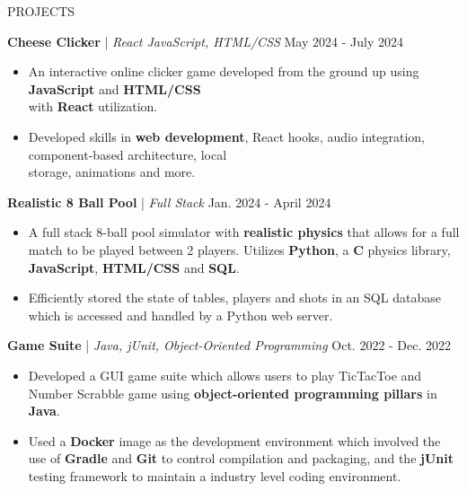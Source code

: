\begin{rSection}{PROJECTS}

\quad\textbf{Cheese Clicker} | \textit{React JavaScript, HTML/CSS } \hfill May 2024 - July 2024\\
\renewcommand\labelitemi{$\vcenter{\hbox{\tiny$\bullet$}}$}
\begin{itemize}
    \itemsep -4pt {} \vspace{-1.5em}
        \item An interactive online clicker game developed from the ground up using \textbf{JavaScript} and \textbf{HTML/CSS} \\ with \textbf{React} utilization.
        \item Developed skills in \textbf{web development}, React hooks, audio integration, component-based architecture, local \\ storage, animations and more.
\end{itemize}

\quad\textbf{Realistic 8 Ball Pool} | \textit{Full Stack} \hfill Jan. 2024 - April 2024\\
\renewcommand\labelitemi{$\vcenter{\hbox{\tiny$\bullet$}}$}
\begin{itemize}
    \itemsep -4pt {} \vspace{-1.5em} 
        \item A full stack 8-ball pool simulator with \textbf{realistic physics} that allows for a full match to be played between 2 players. Utilizes \textbf{Python}, a \textbf{C} physics library, \textbf{JavaScript}, \textbf{HTML/CSS} and \textbf{SQL}.
        \item Efficiently stored the state of tables, players and shots in an SQL database which is accessed and handled by a Python web server.
\end{itemize}

\quad\textbf{Game Suite} | \textit{Java, jUnit, Object-Oriented Programming } \hfill Oct. 2022 - Dec. 2022\\
\renewcommand\labelitemi{$\vcenter{\hbox{\tiny$\bullet$}}$}
\begin{itemize}
    \itemsep -4pt {} \vspace{-1.5em} 
        \item Developed a GUI game suite which allows users to play TicTacToe and Number Scrabble game using \textbf{object-oriented programming pillars} in \textbf{Java}.
        \item Used a \textbf{Docker} image as the development environment which involved the use of 
         \textbf{Gradle} and \textbf{Git} to control compilation and packaging, and the \textbf{jUnit} testing framework to maintain a industry level coding environment.
\end{itemize}




\end{rSection}
